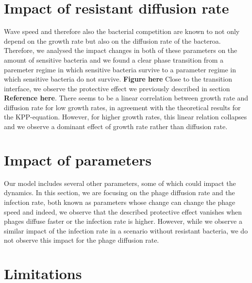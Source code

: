 \section{Impact of resistant diffusion rate}
Wave speed and therefore also the bacterial competition are known to not only depend on the growth rate but also on the diffusion rate of the bacteroa. Therefore, we analysed the impact changes in both of these parameters on the amount of sensitive bacteria and we found a clear phase transition from a paremeter regime in which sensitive bacteria survive to a parameter regime in which sensitive bacteria do not survive. \textbf{Figure here} Close to the transition interface, we observe the protective effect we previously described in section \textbf{Reference here}. There seems to be a linear correlation between growth rate and diffusion rate for low growth rates, in agreement with the theoretical results for the KPP-equation. However, for higher growth rates, this linear relation collapses and we observe a dominant effect of growth rate rather than diffusion rate.
\section{Impact of parameters}
Our model includes several other parameters, some of which could impact the dynamics. In this section, we are focusing on the phage diffusion rate and the infection rate, both known as parameters whose change can change the phage speed and indeed, we observe that the described protective effect vanishes when phages diffuse faster or the infection rate is higher. However, while we observe a similar impact of the infection rate in a scenario without resistant bacteria, we do not observe this impact for the phage diffusion rate. 
\section{Limitations}





